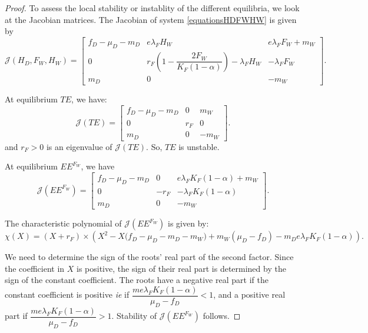 \documentclass{article}
\newcommand{\lfw}{\lambda_{F}}
\newcommand{\lfw}{\lambda_{F}}
\begin{document}
\begin{proof}
To assess the local stability or instablity of the different equilibria, we look at the Jacobian matrices. The Jacobian of system \eqref{equationsHDFWHW} is given by
\begin{equation*}
\mathcal{J}(H_D, F_W, H_W) = \begin{bmatrix}
f_D-\mu_D - m_D & e \lfw H_W & e\lfw F_W + m_W \\
0 & r_F \left( 1 - \dfrac{2F_W}{K_F(1-\alpha)} \right) - \lfw H_W & - \lfw F_W \\
m_D & 0 & -m_W
\end{bmatrix}.
\end{equation*}

At equilibrium $TE$, we have:
\begin{equation*}
\mathcal{J}(TE) = \begin{bmatrix}
f_D-\mu_D - m_D & 0 &  m_W \\
0 & r_F  &  0\\
m_D & 0 & -m_W
\end{bmatrix}.
\end{equation*}
and $r_F > 0$ is an eigenvalue of $\mathcal{J}(TE)$. So, $TE$ is unstable.

At equilibrium $EE^{F_W}$, we have
\begin{equation*}
\mathcal{J}(EE^{F_W}) = \begin{bmatrix}
f_D-\mu_D - m_D & 0 & e\lfw K_F(1-\alpha) + m_W \\
0 & -r_F  & -\lfw K_F(1-\alpha)  \\
m_D & 0 & -m_W
\end{bmatrix}.
\end{equation*}


The characteristic polynomial of $\mathcal{J}(EE^{F_W})$ is given by:
\begin{equation*}
\chi(X) = (X +r_F) \times \left(X^2 - X\Big(f_D - \mu_D - m_D - m_W \Big) + m_W(\mu_D - f_D) - m_D e \lfw K_F(1-\alpha) \right).
\end{equation*}

We need to determine the sign of the roots' real part of the second factor. Since the coefficient in $X$ is positive, the sign of their real part is determined by the sign of the constant coefficient.
The roots have a negative real part if the constant coefficient is positive \textit{ie} if $\dfrac{m e \lfw K_F(1-\alpha)}{\mu_D - f_D} < 1 $, and a positive real part if $\dfrac{m e \lfw K_F(1-\alpha)}{\mu_D - f_D} > 1 $. Stability of $\mathcal{J}(EE^{F_W})$ follows.


\end{proof}
\end{document}
